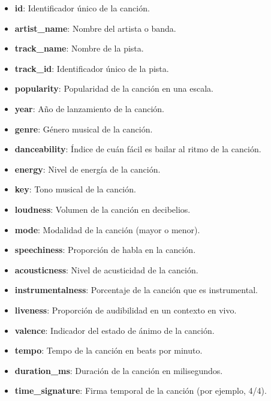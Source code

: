 \documentclass[corference]{IEEEtran}
\begin{document}
\begin{flushleft}
                \begin{itemize}[left=4em]
                    \item \textbf{id}: Identificador único de la canción.
                    \item \textbf{artist\_name}: Nombre del artista o banda.
                    \item \textbf{track\_name}: Nombre de la pista.
                    \item \textbf{track\_id}: Identificador único de la pista.
                    \item \textbf{popularity}: Popularidad de la canción en una escala.
                    \item \textbf{year}: Año de lanzamiento de la canción.
                    \item \textbf{genre}: Género musical de la canción.
                    \item \textbf{danceability}: Índice de cuán fácil es bailar al ritmo de la canción.
                    \item \textbf{energy}: Nivel de energía de la canción.
                    \item \textbf{key}: Tono musical de la canción.
                    \item \textbf{loudness}: Volumen de la canción en decibelios.
                    \item \textbf{mode}: Modalidad de la canción (mayor o menor).
                    \item \textbf{speechiness}: Proporción de habla en la canción.
                    \item \textbf{acousticness}: Nivel de acusticidad de la canción.
                    \item \textbf{instrumentalness}: Porcentaje de la canción que es instrumental.
                    \item \textbf{liveness}: Proporción de audibilidad en un contexto en vivo.
                    \item \textbf{valence}: Indicador del estado de ánimo de la canción.
                    \item \textbf{tempo}: Tempo de la canción en beats por minuto.
                    \item \textbf{duration\_ms}: Duración de la canción en milisegundos.
                    \item \textbf{time\_signature}: Firma temporal de la canción (por ejemplo, 4/4).
                \end{itemize}
            

\end{flushleft}
\end{document}
